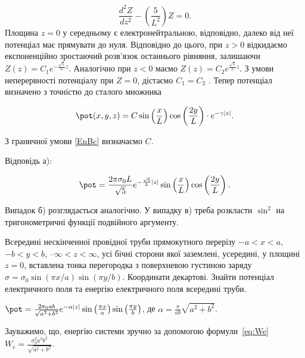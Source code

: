 \begin{problem}
\begin{solution}
\begin{equation*}
    \frac{d^2Z}{dz^2} - \left( \frac{5}{L^2}\right) Z = 0.
\end{equation*}
Площина  $z = 0$ у середньому є електронейтральною, відповідно, далеко від неї потенціал має прямувати до нуля. Відповідно до цього, при $z >0$  відкидаємо експоненційно зростаючий розв’язок останнього рівняння, залишаючи $ Z(z) = C_1  e^{-\frac{\sqrt5}{L}z} $. Аналогічно при $z < 0$  маємо $ Z(z) = C_2  e^{\frac{\sqrt5}{L}z} $. З умови неперервності потенціалу при $Z = 0$, дістаємо $C_1 = C_2$ . Тепер потенціал визначено з точністю до сталого множника


	\begin{equation*}
		\pot (x,y,z) = C \sin\left( \frac{x}{L} \right)   \cos\left( \frac{2y}{L} \right)  \cdot e^{-\gamma |z|}.
	\end{equation*}
	
З граничної умови \eqref{EnBc} визначаємо $C$.

Відповідь а):

	\begin{equation*}
		\pot = \frac{2\pi\sigma_0 L}{\sqrt{5}}e^{-\frac{\sqrt{5}}{L}|z|}\sin\left( \frac{x}{L}\right) \cos\left( \frac{2y}{L}\right) .
	\end{equation*}
\end{solution}

Випадок б) розглядається аналогічно. У випадку в) треба розкласти $\sin^2$ на тригонометричні функції подвійного аргументу. 

\end{problem}

\begin{problem}
Всередині нескінченної провідної труби прямокутного перерізу $-a<x<a$, $-b<y<b$, $–\infty<z<\infty$, усі бічні сторони якої заземлені, усередині, у площині $z=0$, вставлена тонка перегородка з поверхневою густиною заряду $\sigma  = {\sigma _0}\sin (\pi x/a)\sin (\pi y/b)$. Координати декартові. Знайти потенціал електричного поля та енергію електричного поля всередині труби.
\begin{solution}
	$\pot  = \frac{{2{\sigma _0}ab}}{{\sqrt {{a^2} + {b^2}} }}{e^{ - \alpha |z|}}\sin \left( {\frac{{\pi x}}{a}} \right)\sin \left( {\frac{{\pi y}}{b}} \right)$, де $\alpha  = \frac{\pi }{{ab}}\sqrt {{a^2} + {b^2}}$.

    Зауважимо, що, енергію системи зручно за допомогою формули~\eqref{eq:We} 
	$W_e =  \frac{{\sigma _0^2{a^2}{b^2}}}{{\sqrt {{a^2} + {b^2}} }}$.
\end{solution}
\end{problem}

